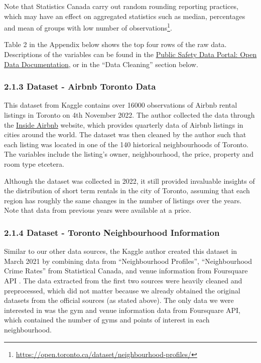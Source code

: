 \documentclass[
]{article}
\begin{document}
Note that Statistics Canada carry out random rounding reporting
practices, which may have an effect on aggregated statistics such as
median, percentages and mean of groups with low number of
observations\footnote{\url{https://open.toronto.ca/dataset/neighbourhood-profiles/}}.

Table 2 in the Appendix below shows the top four rows of the raw data.
Descriptions of the variables can be found in the
\href{https://torontops.maps.arcgis.com/sharing/rest/content/items/c0b17f1888544078bf650f3b8b04d35d/data}{Public
Safety Data Portal: Open Data Documentation}, or in the ``Data
Cleaning'' section below.

\hypertarget{dataset---airbnb-toronto-data}{%
\subsubsection{2.1.3 Dataset - Airbnb Toronto
Data}\label{dataset---airbnb-toronto-data}}

This dataset from Kaggle contains over 16000 observations of Airbnb
rental listings in Toronto on 4th November 2022. The author collected
the data through the \href{http://insideairbnb.com/get-the-data/}{Inside
Airbnb} website, which provides quarterly data of Airbnb listings in
cities around the world. The dataset was then cleaned by the author such
that each listing was located in one of the 140 historical
neighbourhoods of Toronto. The variables include the listing's owner,
neighbourhood, the price, property and room type etcetera.

Although the dataset was collected in 2022, it still provided invaluable
insights of the distribution of short term rentals in the city of
Toronto, assuming that each region has roughly the same changes in the
number of listings over the years. Note that data from previous years
were available at a price.

\hypertarget{dataset---toronto-neighbourhood-information}{%
\subsubsection{2.1.4 Dataset - Toronto Neighbourhood
Information}\label{dataset---toronto-neighbourhood-information}}

Similar to our other data sources, the Kaggle author created this
dataset in March 2021 by combining data from ``Neighbourhood Profiles'',
``Neighbourhood Crime Rates'' from Statistical Canada, and venue
information from Foursquare API . The data extracted from the first two
sources were heavily cleaned and preprocessed, which did not matter
because we already obtained the original datasets from the official
sources (as stated above). The only data we were interested in was the
gym and venue information data from Foursquare API, which contained the
number of gyms and points of interest in each neighbourhood.
\end{document}
